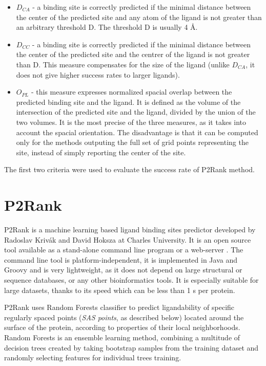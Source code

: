 \begin{itemize}
\item $D_{CA}$ - a binding site is correctly predicted if the minimal distance between the center of the predicted site and any atom of the ligand is not greater than an arbitrary threshold D. The threshold D is usually 4 {\AA}.
\item $D_{CC}$ - a binding site is correctly predicted if the minimal distance between the center of the predicted site and the centrer of the ligand is not greater than D. This measure compensates for the size of the ligand (unlike $D_{CA}$, it does not give higher success rates to larger ligands).
\item $O_{PL}$ - this measure expresses normalized spacial overlap between the predicted binding site and the ligand. It is defined as the volume of the intersection of the predicted site and the ligand, divided by the union of the two volumes. It is the most precise of the three measures, as it takes into account the spacial orientation. The disadvantage is that it can be computed only for the methods outputing the full set of grid points representing the site, instead of simply reporting the center of the site.
\end{itemize}

The first two criteria were used to evaluate the success rate of P2Rank method.

\section{P2Rank}

P2Rank \cite{p2rank1} is a machine learning based ligand binding sites predictor developed by Radoslav Krivák and David Hoksza at Charles University. It is an open source tool available as a stand-alone command line program or a web-server \cite{prankweb}. The command line tool is platform-independent, it is implemented in Java and Groovy and is very lightweight, as it does not depend on large structural or sequence databases, or any other bioinformatics tools. It is especially suitable for large datasets, thanks to its speed which can be less than 1 s per protein. 

P2Rank uses Random Forests classifier \cite{randomforests} to predict ligandability of specific regularly spaced points (\textit{SAS points}, as described below) located around the surface of the protein, according to properties of their local neighborhoods. Random Forests is an ensemble learning method, combining a multitude of decision trees created by taking bootstrap samples from the training dataset and randomly selecting features for individual trees training.

